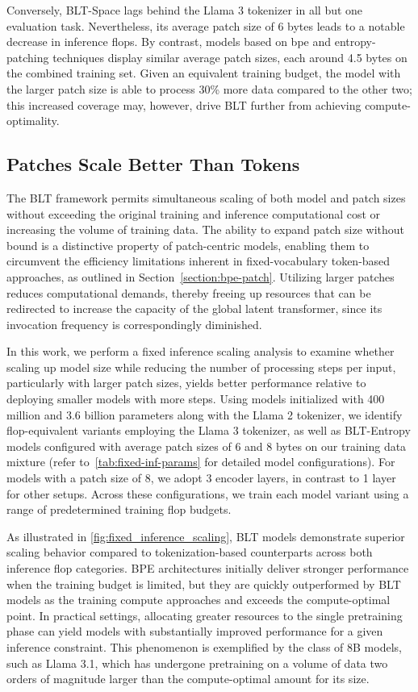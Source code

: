 Conversely, {\textsc BLT}-Space lags behind the Llama 3 tokenizer in all but one evaluation task. Nevertheless, its average patch size of 6 bytes leads to a notable decrease in inference flops. By contrast, models based on bpe and entropy-patching techniques display similar average patch sizes, each around 4.5 bytes on the combined training set. Given an equivalent training budget, the model with the larger patch size is able to process 30\% more data compared to the other two; this increased coverage may, however, drive {\textsc BLT} further from achieving compute-optimality.

\subsection{Patches Scale Better Than Tokens} The {\textsc BLT} framework permits simultaneous scaling of both model and patch sizes without exceeding the original training and inference computational cost or increasing the volume of training data. The ability to expand patch size without bound is a distinctive property of patch-centric models, enabling them to circumvent the efficiency limitations inherent in fixed-vocabulary token-based approaches, as outlined in Section~\ref{section:bpe-patch}. Utilizing larger patches reduces computational demands, thereby freeing up resources that can be redirected to increase the capacity of the global latent transformer, since its invocation frequency is correspondingly diminished.

In this work, we perform a fixed inference scaling analysis to examine whether scaling up model size while reducing the number of processing steps per input, particularly with larger patch sizes, yields better performance relative to deploying smaller models with more steps. Using models initialized with 400 million and 3.6 billion parameters along with the Llama 2 tokenizer, we identify flop-equivalent variants employing the Llama 3 tokenizer, as well as {\textsc BLT}-Entropy models configured with average patch sizes of 6 and 8 bytes on our training data mixture (refer to~\autoref{tab:fixed-inf-params} for detailed model configurations). For models with a patch size of 8, we adopt 3 encoder layers, in contrast to 1 layer for other setups. Across these configurations, we train each model variant using a range of predetermined training flop budgets.

As illustrated in \autoref{fig:fixed_inference_scaling}, {\textsc BLT} models demonstrate superior scaling behavior compared to tokenization-based counterparts across both inference flop categories. BPE architectures initially deliver stronger performance when the training budget is limited, but they are quickly outperformed by {\textsc BLT} models as the training compute approaches and exceeds the compute-optimal point. In practical settings, allocating greater resources to the single pretraining phase can yield models with substantially improved performance for a given inference constraint. This phenomenon is exemplified by the class of 8B models, such as Llama 3.1, which has undergone pretraining on a volume of data two orders of magnitude larger than the compute-optimal amount for its size.


